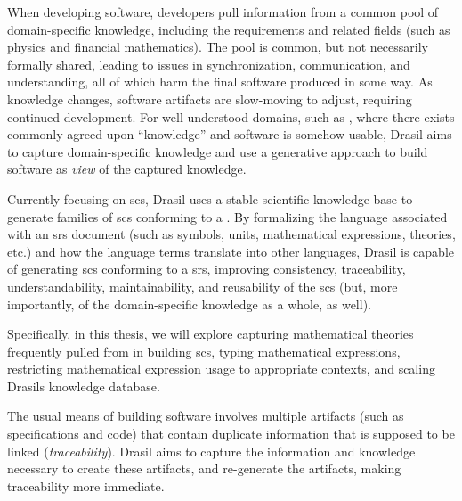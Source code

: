 When developing software, developers pull information from a common pool of
domain-specific knowledge, including the requirements and related fields (such
as physics and financial mathematics). The pool is common, but not necessarily
formally shared, leading to issues in synchronization, communication, and
understanding, all of which harm the final software produced in some way. As
knowledge changes, software artifacts are slow-moving to adjust, requiring
continued development. For well-understood domains, such as , where
there exists commonly agreed upon ``knowledge'' and software is somehow usable,
Drasil aims to capture domain-specific knowledge and use a generative approach
to build software as \textit{view} of the captured knowledge.

Currently focusing on \acs{scs}, Drasil uses a stable scientific knowledge-base
to generate families of \acs{scs} conforming to a 
\cite{SmithAndLai2005}. By formalizing the language associated with an \acf{srs}
document (such as symbols, units, mathematical expressions, theories, etc.) and
how the language terms translate into other languages, Drasil is capable of
generating \acs{scs} conforming to a \acf{srs}, improving consistency,
traceability, understandability, maintainability, and reusability of the
\acf{scs} (but, more importantly, of the domain-specific knowledge as a whole,
as well).

Specifically, in this thesis, we will explore capturing mathematical theories
frequently pulled from in building \acs{scs}, typing mathematical expressions,
restricting mathematical expression usage to appropriate contexts, and scaling
Drasils knowledge database.


\iffalse
      The usual means of building software involves multiple artifacts (such as
      specifications and code) that contain duplicate information that is
      supposed to be linked (\textit{traceability}). Drasil aims to capture the
      information and knowledge necessary to create these artifacts, and
      re-generate the artifacts, making traceability more immediate.

